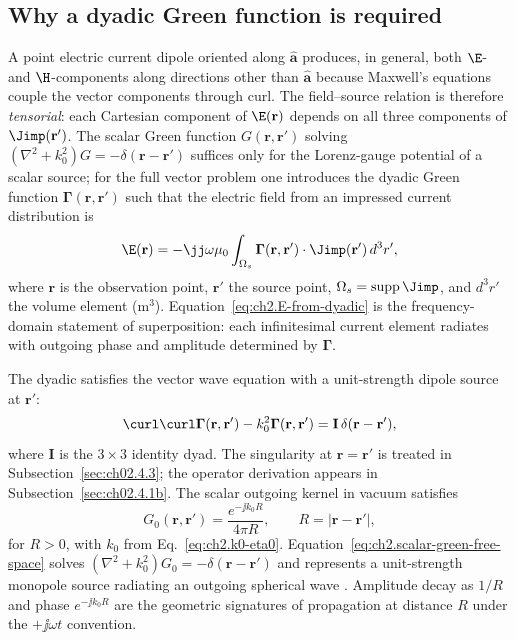 \subsection{Why a dyadic Green function is required}
\label{sec:ch02.4.1}

A point electric current dipole oriented along $\hat{\mathbf{a}}$ produces, in general, both $\E$- and $\H$-components along directions other than $\hat{\mathbf{a}}$ because Maxwell's equations couple the vector components through curl. The field--source relation is therefore \emph{tensorial}: each Cartesian component of $\E(\mathbf{r})$ depends on all three components of $\Jimp(\mathbf{r}')$. The scalar Green function $G(\mathbf{r},\mathbf{r}')$ solving $(\nabla^2+k_0^2)G=-\delta(\mathbf{r}-\mathbf{r}')$ suffices only for the Lorenz-gauge potential of a scalar source; for the full vector problem one introduces the dyadic Green function $\boldsymbol{\Gamma}(\mathbf{r},\mathbf{r}')$ such that the electric field from an impressed current distribution is \cite{stratton1941,harrington2001}
\begin{equation}
\label{eq:ch2.E-from-dyadic}
\E(\mathbf{r})=-\jj\omega\mu_0\int_{\Omega_s}\boldsymbol{\Gamma}(\mathbf{r},\mathbf{r}')\cdot\Jimp(\mathbf{r}')\,d^3r',
\end{equation}
where $\mathbf{r}$ is the observation point, $\mathbf{r}'$ the source point, $\Omega_s=\operatorname{supp}\Jimp$, and $d^3r'$ the volume element (m$^3$). Equation~\eqref{eq:ch2.E-from-dyadic} is the frequency-domain statement of superposition: each infinitesimal current element radiates with outgoing phase and amplitude determined by $\boldsymbol{\Gamma}$.

The dyadic satisfies the vector wave equation with a unit-strength dipole source at $\mathbf{r}'$:
\begin{equation}
\label{eq:ch2.dyadic-green-pde}
\curl\curl\boldsymbol{\Gamma}(\mathbf{r},\mathbf{r}')-k_0^2\boldsymbol{\Gamma}(\mathbf{r},\mathbf{r}')=
\mathbf{I}\,\delta(\mathbf{r}-\mathbf{r}'),
\end{equation}
where $\mathbf{I}$ is the $3\times3$ identity dyad. The singularity at $\mathbf{r}=\mathbf{r}'$ is treated in Subsection~\ref{sec:ch02.4.3}; the operator derivation appears in Subsection~\ref{sec:ch02.4.1b}. The scalar outgoing kernel in vacuum satisfies
\begin{equation}
\label{eq:ch2.scalar-green-free-space}
G_0(\mathbf{r},\mathbf{r}')=\frac{e^{-\jj k_0 R}}{4\pi R},
\qquad
R=|\mathbf{r}-\mathbf{r}'|,
\end{equation}
for $R>0$, with $k_0$ from Eq.~\eqref{eq:ch2.k0-eta0}. Equation~\eqref{eq:ch2.scalar-green-free-space} solves $(\nabla^2+k_0^2)G_0=-\delta(\mathbf{r}-\mathbf{r}')$ and represents a unit-strength monopole source radiating an outgoing spherical wave \cite{stratton1941,jackson1999}. Amplitude decay as $1/R$ and phase $e^{-\jj k_0 R}$ are the geometric signatures of propagation at distance $R$ under the $+\jj\omega t$ convention.

